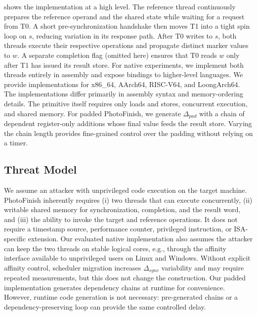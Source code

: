 \documentclass[letterpaper,twocolumn,10pt]{article} %
\newcommand{\AttackName}{PhotoFinish\xspace}
\newcommand{\tprobe}{{\fontfamily{cmtt}\selectfont T0}\xspace}
\newcommand{\tref}{{\fontfamily{cmtt}\selectfont T1}\xspace}
\begin{document}
 shows the implementation at a high level.
The reference thread continuously prepares the reference operand and the shared state while waiting for a request from \tprobe.
A short pre-synchronization handshake then moves \tref into a tight spin loop on $s$, reducing variation in its response path.
After \tprobe writes to $s$, both threads execute their respective operations and propagate distinct marker values to $w$.
A separate completion flag (omitted here) ensures that \tprobe reads $w$ only after \tref has issued its result store.
For native experiments, we implement both threads entirely in assembly and expose bindings to higher-level languages.
We provide implementations for x86\_64, AArch64, RISC-V64, and LoongArch64.
The implementations differ primarily in assembly syntax and memory-ordering details.
The primitive itself requires only loads and stores, concurrent execution, and shared memory.
For padded \AttackName, we generate $\Delta_{pad}$ with a chain of dependent register-only additions whose final value feeds the result store.
Varying the chain length provides fine-grained control over the padding without relying on a timer.




\subsection{Threat Model}\label{subsec:threat-model}

We assume an attacker with unprivileged code execution on the target machine.
\AttackName inherently requires (i) two threads that can execute concurrently, (ii) writable shared memory for synchronization, completion, and the result word, and (iii) the ability to invoke the target and reference operations.
It does not require a timestamp source, performance counter, privileged instruction, or ISA-specific extension.
Our evaluated native implementation also assumes the attacker can keep the two threads on stable logical cores, e.g., through the affinity interface available to unprivileged users on Linux and Windows.
Without explicit affinity control, scheduler migration increases $\Delta_{sync}$ variability and may require repeated measurements, but this does not change the construction.
Our padded implementation generates dependency chains at runtime for convenience.
However, runtime code generation is not necessary: pre-generated chains or a dependency-preserving loop can provide the same controlled delay.
\end{document}
